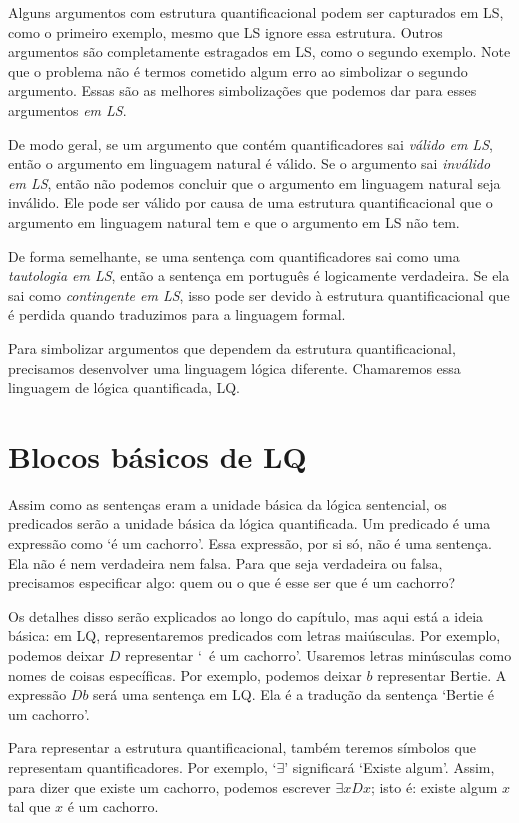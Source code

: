 Alguns argumentos com estrutura quantificacional podem ser capturados em LS, como o primeiro exemplo, mesmo que LS ignore essa estrutura. Outros argumentos são completamente estragados em LS, como o segundo exemplo. Note que o problema não é termos cometido algum erro ao simbolizar o segundo argumento. Essas são as melhores simbolizações que podemos dar para esses argumentos \emph{em LS}.

De modo geral, se um argumento que contém quantificadores sai \emph{válido em LS}, então o argumento em linguagem natural é válido. Se o argumento sai \emph{inválido em LS}, então não podemos concluir que o argumento em linguagem natural seja inválido. Ele pode ser válido por causa de uma estrutura quantificacional que o argumento em linguagem natural tem e que o argumento em LS não tem.

De forma semelhante, se uma sentença com quantificadores sai como uma \emph{tautologia em LS}, então a sentença em português é logicamente verdadeira. Se ela sai como \emph{contingente em LS}, isso pode ser devido à estrutura quantificacional que é perdida quando traduzimos para a linguagem formal.

Para simbolizar argumentos que dependem da estrutura quantificacional, precisamos desenvolver uma linguagem lógica diferente. Chamaremos essa linguagem de lógica quantificada, LQ.


\section{Blocos básicos de LQ}

Assim como as sentenças eram a unidade básica da lógica sentencial, os predicados serão a unidade básica da lógica quantificada. Um predicado é uma expressão como `é um cachorro'. Essa expressão, por si só, não é uma sentença. Ela não é nem verdadeira nem falsa. Para que seja verdadeira ou falsa, precisamos especificar algo: quem ou o que é esse ser que é um cachorro?

Os detalhes disso serão explicados ao longo do capítulo, mas aqui está a ideia básica: em LQ, representaremos predicados com letras maiúsculas. Por exemplo, podemos deixar $D$ representar `\blank\ é um cachorro'. Usaremos letras minúsculas como nomes de coisas específicas. Por exemplo, podemos deixar $b$ representar Bertie. A expressão $Db$ será uma sentença em LQ. Ela é a tradução da sentença `Bertie é um cachorro'.

Para representar a estrutura quantificacional, também teremos símbolos que representam quantificadores. Por exemplo, `$\exists$' significará `Existe algum\blank'. Assim, para dizer que existe um cachorro, podemos escrever $\exists x Dx$; isto é: existe algum $x$ tal que $x$ é um cachorro.

